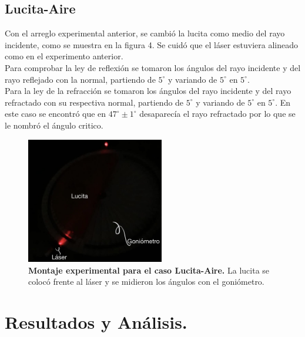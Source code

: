 \documentclass[DIV=calc, paper=a4, fontsize=11pt]{scrartcl}
\begin{document}
\subsection*{\textcolor{carmine}{Lucita-Aire}}
Con el arreglo experimental anterior, se cambió la lucita como medio del rayo incidente, como se muestra en la figura 4. Se cuidó que el láser estuviera  alineado como en el experimento anterior.\\
Para comprobar la ley de reflexión se tomaron los ángulos del rayo incidente y del rayo reflejado con la normal,  partiendo de $5^{\circ}$ y variando de $5^{\circ}$ en $5^{\circ}$.
\\
Para la ley de la refracción se tomaron los ángulos del rayo incidente y del rayo refractado con su respectiva normal, partiendo de $5^{\circ}$ y variando de $5^{\circ}$ en $5^{\circ}$. En este caso se encontró que en $47^{\circ}\pm1^{\circ}$ desaparecía el rayo refractado por lo que se le nombró el ángulo critico.
\begin{figure}[H]
    \centering
    \includegraphics[width=6cm]{imagenes/B83169D6-410E-4924-B0E5-842D628921D4.jpeg}
    \caption{\textbf{Montaje experimental para el caso Lucita-Aire.} La lucita se colocó frente al láser y se midieron los ángulos con  el goniómetro.}
    \label{fig:my_label}
\end{figure}




\section*{\textcolor{carmine}{Resultados y Análisis.}}
\end{document}

